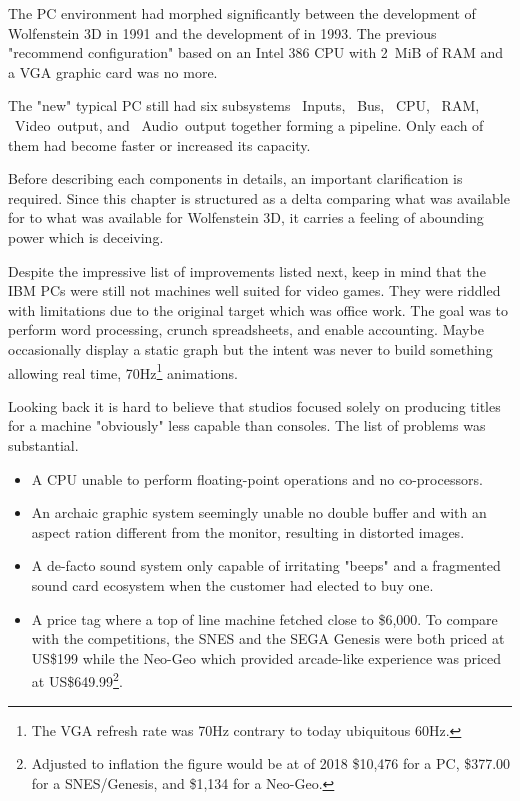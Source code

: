 The PC environment had morphed significantly between the development of Wolfenstein 3D in 1991 and the development of \doom{} in 1993. The previous "recommend configuration" based on an Intel 386 CPU with 2~MiB of RAM and a VGA graphic card was no more.\\
\par
The "new" typical PC still had six subsystems ~Inputs, ~Bus, ~CPU, ~RAM, ~Video~output, and ~Audio~output together forming a pipeline. Only each of them had become faster or increased its capacity.\\
\par
\vspace{2mm}
\par
 Before describing each components in details, an important clarification is required. Since this chapter is structured as a delta comparing what was available for \doom{} to what was available for Wolfenstein 3D, it carries a feeling of abounding power which is deceiving. \\
 \par
 Despite the impressive list of improvements listed next, keep in mind that the IBM PCs were still not machines well suited for video games. They were riddled with limitations due to the original target which was office work. The goal was to perform word processing, crunch spreadsheets, and enable accounting. Maybe occasionally display a static graph but the intent was never to build something allowing real time, 70Hz\footnote{The VGA refresh rate was 70Hz contrary to today ubiquitous 60Hz.} animations.\\ 
\par 
Looking back it is hard to believe that studios focused solely on producing titles for a machine "obviously" less capable than consoles. The list of problems was substantial.
\begin{itemize}
\item A CPU unable to perform floating-point operations and no co-processors.
\item An archaic graphic system seemingly unable no double buffer and with an aspect ration different from the monitor, resulting in distorted images.
\item A de-facto sound system only capable of irritating "beeps" and a fragmented sound card ecosystem when the customer had elected to buy one.
\item A price tag where a top of line machine fetched close to \$6,000. To compare with the competitions, the SNES and the SEGA Genesis were both priced at US\$199 while the Neo-Geo which provided arcade-like experience was priced at US\$649.99\footnote{Adjusted to inflation the figure would be at of 2018 \$10,476 for a PC, \$377.00 for a SNES/Genesis, and \$1,134 for a Neo-Geo.}.
\end{itemize}
